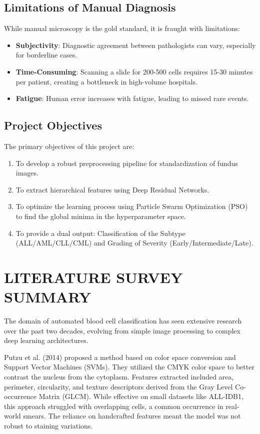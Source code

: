 \documentclass[twocolumn,10pt,a4paper]{article}
\begin{document}
\subsection{Limitations of Manual Diagnosis}
While manual microscopy is the gold standard, it is fraught with limitations:
\begin{itemize}
    \item \textbf{Subjectivity}: Diagnostic agreement between pathologists can vary, especially for borderline cases.
    \item \textbf{Time-Consuming}: Scanning a slide for 200-500 cells requires 15-30 minutes per patient, creating a bottleneck in high-volume hospitals.
    \item \textbf{Fatigue}: Human error increases with fatigue, leading to missed rare events.
\end{itemize}

\subsection{Project Objectives}
The primary objectives of this project are:
\begin{enumerate}
    \item To develop a robust preprocessing pipeline for standardization of fundus images.
    \item To extract hierarchical features using Deep Residual Networks.
    \item To optimize the learning process using Particle Swarm Optimization (PSO) to find the global minima in the hyperparameter space.
    \item To provide a dual output: Classification of the Subtype (ALL/AML/CLL/CML) and Grading of Severity (Early/Intermediate/Late).
\end{enumerate}

\section{LITERATURE SURVEY SUMMARY}
The domain of automated blood cell classification has seen extensive research over the past two decades, evolving from simple image processing to complex deep learning architectures.

Putzu et al. (2014) proposed a method based on color space conversion and Support Vector Machines (SVMs). They utilized the CMYK color space to better contrast the nucleus from the cytoplasm. Features extracted included area, perimeter, circularity, and texture descriptors derived from the Gray Level Co-occurrence Matrix (GLCM). While effective on small datasets like ALL-IDB1, this approach struggled with overlapping cells, a common occurrence in real-world smears. The reliance on handcrafted features meant the model was not robust to staining variations.
\end{document}
